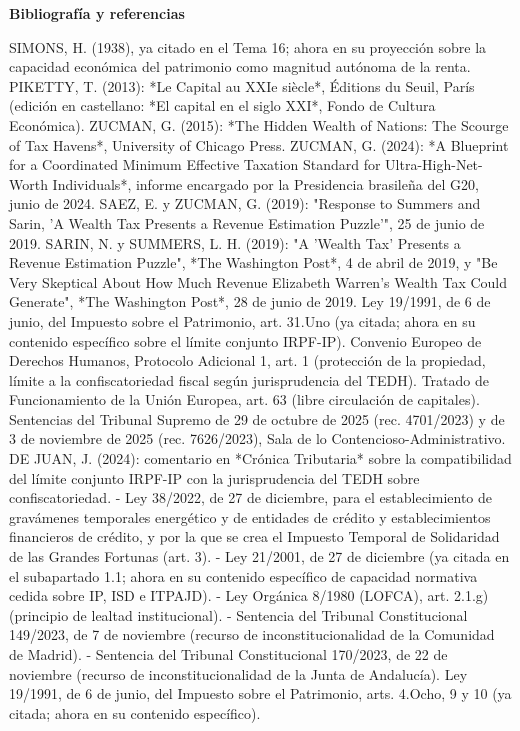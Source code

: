 \documentclass[10pt,a4paper]{article}
\newcounter{myref}
\newcommand{\MyBibliography}{%
  \clearpage
  \phantomsection
  {\centering\bfseries\Large Bibliografía y referencias\par}%
  \medskip
  \addcontentsline{stc}{section}{Bibliografía y referencias}%
  \setcounter{myref}{0}%
}
\begin{document}
\clearpage
{}
\MyBibliography

SIMONS, H. (1938), ya citado en el Tema 16; ahora en su proyección sobre la capacidad económica del patrimonio como magnitud autónoma de la renta.
PIKETTY, T. (2013): *Le Capital au XXIe siècle*, Éditions du Seuil, París (edición en castellano: *El capital en el siglo XXI*, Fondo de Cultura Económica).
ZUCMAN, G. (2015): *The Hidden Wealth of Nations: The Scourge of Tax Havens*, University of Chicago Press.
ZUCMAN, G. (2024): *A Blueprint for a Coordinated Minimum Effective Taxation Standard for Ultra-High-Net-Worth Individuals*, informe encargado por la Presidencia brasileña del G20, junio de 2024.
SAEZ, E. y ZUCMAN, G. (2019): "Response to Summers and Sarin, 'A Wealth Tax Presents a Revenue Estimation Puzzle'", 25 de junio de 2019.
SARIN, N. y SUMMERS, L. H. (2019): "A 'Wealth Tax' Presents a Revenue Estimation Puzzle", *The Washington Post*, 4 de abril de 2019, y "Be Very Skeptical About How Much Revenue Elizabeth Warren's Wealth Tax Could Generate", *The Washington Post*, 28 de junio de 2019.
Ley 19/1991, de 6 de junio, del Impuesto sobre el Patrimonio, art. 31.Uno (ya citada; ahora en su contenido específico sobre el límite conjunto IRPF-IP).
Convenio Europeo de Derechos Humanos, Protocolo Adicional 1, art. 1 (protección de la propiedad, límite a la confiscatoriedad fiscal según jurisprudencia del TEDH).
Tratado de Funcionamiento de la Unión Europea, art. 63 (libre circulación de capitales).
Sentencias del Tribunal Supremo de 29 de octubre de 2025 (rec. 4701/2023) y de 3 de noviembre de 2025 (rec. 7626/2023), Sala de lo Contencioso-Administrativo.
DE JUAN, J. (2024): comentario en *Crónica Tributaria* sobre la compatibilidad del límite conjunto IRPF-IP con la jurisprudencia del TEDH sobre confiscatoriedad.
- Ley 38/2022, de 27 de diciembre, para el establecimiento de gravámenes temporales energético y de entidades de crédito y establecimientos financieros de crédito, y por la que se crea el Impuesto Temporal de Solidaridad de las Grandes Fortunas (art. 3).
- Ley 21/2001, de 27 de diciembre (ya citada en el subapartado 1.1; ahora en su contenido específico de capacidad normativa cedida sobre IP, ISD e ITPAJD).
- Ley Orgánica 8/1980 (LOFCA), art. 2.1.g) (principio de lealtad institucional).
- Sentencia del Tribunal Constitucional 149/2023, de 7 de noviembre (recurso de inconstitucionalidad de la Comunidad de Madrid).
- Sentencia del Tribunal Constitucional 170/2023, de 22 de noviembre (recurso de inconstitucionalidad de la Junta de Andalucía).
Ley 19/1991, de 6 de junio, del Impuesto sobre el Patrimonio, arts. 4.Ocho, 9 y 10 (ya citada; ahora en su contenido específico).
\end{document}

